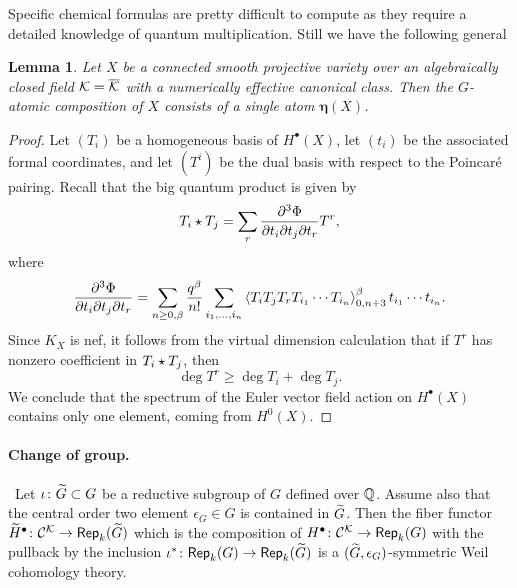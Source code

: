 \documentclass[twoside,leqno]{article}
\numberwithin{equation}{section}
\theoremstyle{plain}
\newtheorem{lemma}[equation]{Lemma}
\theoremstyle{definition}
\begin{document}
\bigskip 


Specific chemical formulas are pretty difficult to compute as they require a detailed knowledge of quantum multiplication. Still we have the 
following general

\begin{lemma} \label{lem:GatomsnefK}
Let $X$ be a connected smooth projective variety over an algebraically closed field 
$\mathcal K = \overline{\mathcal K}$ with a numerically effective canonical class.
Then the $G$-atomic composition of $X$ consists of a single atom
$\boldsymbol{\eta}(X)$.
\end{lemma}
\begin{proof}
    Let $(T_i)$ be a homogeneous basis of $H^{\bullet}(X)$, let $(t_i)$ be the associated formal coordinates, and let $(T^i)$ be the dual basis with respect to the Poincar\'{e} pairing.
    Recall that the big quantum product is given by
    \[ T_i \star T_j = \sum_r \frac{\partial^3 \Phi}{\partial t_i \partial t_j \partial t_r} T^r, \]
    where
    \[
    \frac{\partial^3\Phi}{\partial t_i \partial t_j \partial t_r} = \sum_{n\ge 0,\beta} \frac{q^\beta}{n!} \sum_{i_1,\dots,i_n} \braket{T_i T_j T_r T_{i_1}\cdots T_{i_n}}_{0,n+3}^{\beta} t_{i_1}\cdots t_{i_n} .\]
    Since $K_X$ is nef, it follows from the virtual dimension calculation that if $T^r$ has nonzero coefficient in $T_i \star T_j$, then
    \[ \deg T^r \ge \deg T_i + \deg T_j. \]
    We conclude that the spectrum of the Euler vector field action on $H^{\bullet}(X)$ contains only one element, coming from $H^0(X)$.
\end{proof}
 
\paragraph{Change of group.} \label{par:changeG}  \ Let $\iota \colon \widetilde G \subset G$ be a reductive subgroup of $G$ defined over $\mathbb Q$. Assume also that the central order two element 
$\epsilon_{G} \in G$ is contained in $\widetilde G$. Then the fiber functor \linebreak 
$\widetilde H^{\bullet} \colon \mathcal{C}^{\mathcal K} \to \mathsf{Rep}_{k}(\widetilde G)$ which is the composition of $H^{\bullet} \colon \mathcal{C}^{\mathcal K} \to \mathsf{Rep}_{k}(G)$ with the pullback by the inclusion 
$\iota^{*} \colon \mathsf{Rep}_{k}(G) \to \mathsf{Rep}_{k}(\widetilde G)$ is a $(\widetilde G,\epsilon_{G})$-symmetric Weil cohomology theory. 
\end{document}
